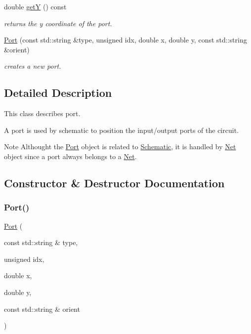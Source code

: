 \begin{DoxyCompactItemize}
\mbox{\label{class_open_chams_1_1_port_aafa51c7f8f38a09febbb9ce7853f77b4}} 
double \hyperlink{class_open_chams_1_1_port_aafa51c7f8f38a09febbb9ce7853f77b4}{getY} () const
\begin{DoxyCompactList}\small\item\em returns the y coordinate of the port. \end{DoxyCompactList}\item 
\hyperlink{class_open_chams_1_1_port_ab13daf22aea531e874ff42a71b49a112}{Port} (const std\+::string \&type, unsigned idx, double x, double y, const std\+::string \&orient)
\begin{DoxyCompactList}\small\item\em creates a new port. \end{DoxyCompactList}\end{DoxyCompactItemize}


\subsection{Detailed Description}
This class describes port.

A port is used by schematic to position the input/output ports of the circuit.

\begin{DoxyNote}{Note}
Althought the \hyperlink{class_open_chams_1_1_port}{Port} object is related to \hyperlink{class_open_chams_1_1_schematic}{Schematic}, it is handled by \hyperlink{class_open_chams_1_1_net}{Net} object since a port always belongs to a \hyperlink{class_open_chams_1_1_net}{Net}. 
\end{DoxyNote}


\subsection{Constructor \& Destructor Documentation}
\mbox{\label{class_open_chams_1_1_port_ab13daf22aea531e874ff42a71b49a112}} 
\subsubsection{\texorpdfstring{Port()}{Port()}}
{\footnotesize\ttfamily \hyperlink{class_open_chams_1_1_port}{Port} (\begin{DoxyParamCaption}\item[{const std\+::string \&}]{type,  }\item[{unsigned}]{idx,  }\item[{double}]{x,  }\item[{double}]{y,  }\item[{const std\+::string \&}]{orient }\end{DoxyParamCaption})\hspace{0.3cm}{\ttfamily [inline]}}



